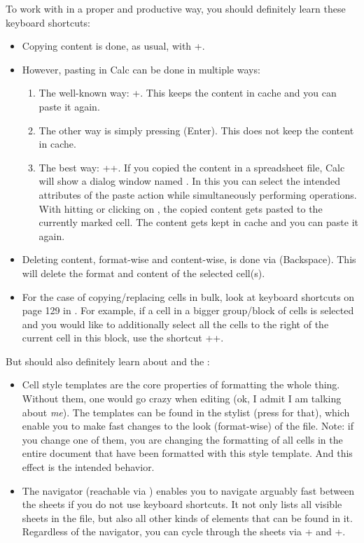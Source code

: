 To work with \tfn in a proper and productive way, you should definitely learn these keyboard shortcuts:
\begin{itemize}
	\item Copying content is done, as usual, with +.
	\item However, pasting in Calc can be done in multiple ways:
	\begin{enumerate}
		\item The well-known way: +.
		This keeps the content in cache and you can paste it again.
		\item The other way is simply pressing \keystroke{\( \hookleftarrow \)} (Enter).
		This does not keep the content in cache.
		\item The best way: ++.
		If you copied the content in a spreadsheet file, Calc will show a dialog window named .
		In this you can select the intended attributes of the paste action while simultaneously performing operations.
		With hitting \keystroke{\( \hookleftarrow \)} or clicking on , the copied content gets pasted to the currently marked cell.
		The content gets kept in cache and you can paste it again.
	\end{enumerate}
	\item Deleting content, format-wise and content-wise, is done via \keystroke{\( \longleftarrow \)} (Backspace).
	This will delete the format and content of the selected cell(s).
	\item For the case of copying/replacing cells in bulk, look at keyboard shortcuts on page 129 in .
	For example, if a cell in a bigger group/block of cells is selected and you would like to additionally select all the cells to the right of the current cell in this block, use the shortcut ++\keystroke{\( \rightarrow \)}.
\end{itemize}

But should also definitely learn about  and the :
\begin{itemize}
	\item Cell style templates are the core properties of formatting the whole thing.
	Without them, one would go crazy when editing \tfn (ok, I admit I am talking about \emph{me}).
	The templates can be found in the stylist (press  for that), which enable you to make fast changes to the look (format-wise) of the file.
	Note: if you change one of them, you are changing the formatting of all cells in the entire document that have been formatted with this style template.
	And this effect is the intended behavior.
	\item The navigator (reachable via ) enables you to navigate arguably fast between the sheets if you do not use keyboard shortcuts.
	It not only lists all visible sheets in the file, but also all other kinds of elements that can be found in it.
	Regardless of the navigator, you can cycle through the sheets via + and +.
\end{itemize}


